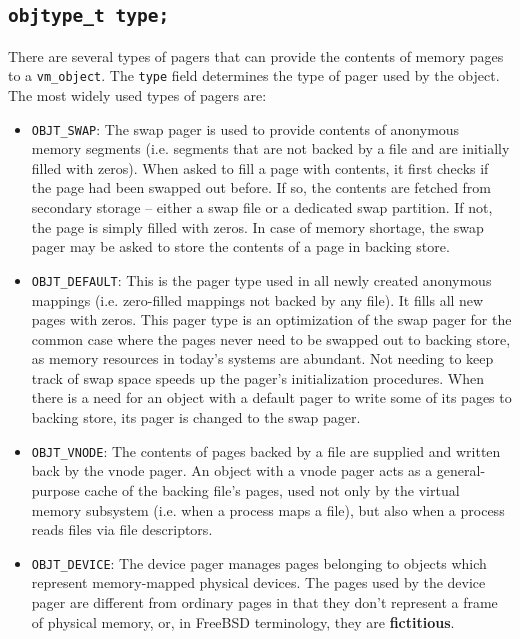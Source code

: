 \documentclass[shortabstract, english]{iithesis}
\begin{document}
\subsection*{\texttt{objtype_t type;}}

There are several types of pagers that can provide the contents of memory pages
to a \texttt{vm_object}. The \texttt{type} field determines the
type of pager used by the object. The most widely used types of pagers are:

\begin{itemize}

\item \texttt{OBJT_SWAP}: The swap pager is used to provide contents of
  anonymous memory segments (i.e. segments that are not backed by a file and are
  initially filled with zeros). When asked to fill a page with contents, it
  first checks if the page had been swapped out before. If so, the contents are
  fetched from secondary storage -- either a swap file or a dedicated swap
  partition. If not, the page is simply filled with zeros. In case of memory
  shortage, the swap pager may be asked to store the contents of a page in
  backing store.

\item \texttt{OBJT_DEFAULT}: This is the pager type used in all newly
  created anonymous mappings (i.e. zero-filled mappings not backed by any file).
  It fills all new pages with zeros. This pager type is an optimization of the
  swap pager for the common case where the pages never need to be swapped out to
  backing store, as memory resources in today's systems are abundant. Not
  needing to keep track of swap space speeds up the pager's initialization
  procedures. When there is a need for an object with a default pager to write
  some of its pages to backing store, its pager is changed to the swap pager.

\item \texttt{OBJT_VNODE}: The contents of pages backed by a file are
  supplied and written back by the vnode pager. An object with a vnode pager
  acts as a general-purpose cache of the backing file's pages, used not only by
  the virtual memory subsystem (i.e. when a process maps a file), but also when
  a process reads files via file descriptors.

\item \texttt{OBJT_DEVICE}: The device pager manages pages belonging to
  objects which represent memory-mapped physical devices. The pages used by the
  device pager are different from ordinary pages in that they don't represent a
  frame of physical memory, or, in FreeBSD terminology, they are
  \textbf{fictitious}.
\end{itemize}
\end{document}
